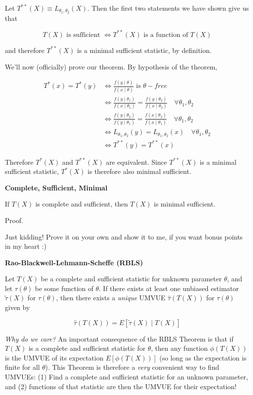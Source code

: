 \documentclass[
  letterpaper,
  DIV=11,
  numbers=noendperiod]{scrreprt}
\begin{document}
Let \(T^{**}(X) \equiv L_{\theta_1, \theta_2}(X)\). Then the first two
statements we have shown give us that

\[
T(X) \text{ is sufficient } \iff T^{**}(X) \text{ is a function of } T(X)
\]

and therefore \(T^{**}(X)\) is a minimal sufficient statistic, by
definition.

We'll now (officially) prove our theorem. By hypothesis of the theorem,

\begin{align*}
    T^*(x) = T^*(y) & \iff \frac{f(y \mid \theta)}{f(x \mid \theta)} \text{ is } \theta-free \\
    & \iff \frac{f(y \mid \theta_1)}{f(x \mid \theta_1)} = \frac{f(y \mid \theta_2)}{f(x \mid \theta_2)} \quad \forall \theta_1, \theta_2 \\
    & \iff \frac{f(y \mid \theta_2)}{f(y \mid \theta_1)} = \frac{f(x \mid \theta_2)}{f(x \mid \theta_1)} \quad \forall \theta_1, \theta_2 \\
    & \iff L_{\theta_1, \theta_2}(y) = L_{\theta_1, \theta_2} (x) \quad \forall \theta_1, \theta_2 \\
    & \iff T^{**}(y) = T^{**}(x)
\end{align*}

Therefore \(T^*(X)\) and \(T^{**}(X)\) are equivalent. Since
\(T^{**}(X)\) is a minimal sufficient statistic, \(T^*(X)\) is therefore
also minimal sufficient.

\textbf{Complete, Sufficient, Minimal}

If \(T(X)\) is complete and sufficient, then \(T(X)\) is minimal
sufficient.

Proof.

Just kidding! Prove it on your own and show it to me, if you want bonus
points in my heart :)

\textbf{Rao-Blackwell-Lehmann-Scheffe (RBLS)}

Let \(T(X)\) be a complete and sufficient statistic for unknown
parameter \(\theta\), and let \(\tau(\theta)\) be some function of
\(\theta\). If there exists at least one unbiased estimator
\(\tilde{\tau}(X)\) for \(\tau(\theta)\), then there exists a
\emph{unique} UMVUE \(\hat{\tau}(T(X))\) for \(\tau(\theta)\) given by

\[
\hat{\tau}(T(X)) = E[\tilde{\tau}(X) \mid T(X)]
\]

\emph{Why do we care?} An important consequence of the RBLS Theorem is
that if \(T(X)\) is a complete and sufficient statistic for \(\theta\),
then any function \(\phi(T(X))\) is the UMVUE of its expectation
\(E[\phi(T(X))]\) (so long as the expectation is finite for all
\(\theta\)). This Theorem is therefore a \emph{very} convenient way to
find UMVUEs: (1) Find a complete and sufficient statistic for an unknown
parameter, and (2) functions of that statistic are then the UMVUE for
their expectation!
\end{document}
